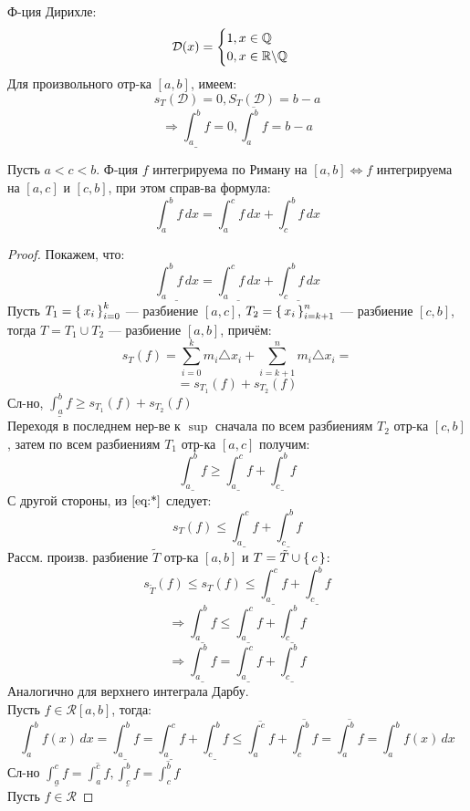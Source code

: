 \begin{example}
Ф-ция Дирихле:
\[
\mathcal{D}(x) = \begin{cases}
1, x \in \mathbb{Q} \\
0, x \in \mathbb{R} \backslash \mathbb{Q}
\end{cases}
\]
Для произвольного отр-ка $[a, b]$, имеем:
\[
s_T(\mathcal{D}) = 0, S_T(\mathcal{D}) = b - a
\]
\[
\Rightarrow \underline{\int_{a}^{b} f} = 0, \overline{\int_{a}^{b} f} = b - a
\]
\end{example}
\begin{consequence}
  \label{cs:riemann_feature_1}
  Пусть $a < c < b$. Ф-ция $f$ интегрируема по Риману на $[a, b] \iff f $ интегрируема на $[a, c]$ и $[c, b]$, при этом справ-ва формула:
  \[
    \int_{a}^{b} f \, dx = \int_{a}^{c} f \, dx + \int_{c}^{b} f \, dx
  \]
\end{consequence}
\begin{proof}
Покажем, что:
\[
  \underline{\int_{a}^{b} f \, dx} = \underline{\int_{a}^{c} f \, dx} + \underline{\int_{c}^{b} f \, dx}
\]
Пусть $T_1 = \set{x_i}_{i = 0}^{k}$ --- разбиение $[a, c]$, $T_2 = \set{x_i}_{i = k + 1}^{n}$ --- разбиение $[c, b]$, тогда $T = T_1 \cup T_2$ --- разбиение $[a, b]$, причём:
\[
s_{T}(f) = \sum_{i = 0}^{k} m_i \triangle x_i + \sum_{i = k + 1}^{n} m_i \triangle x_i = 
\]
\begin{equation}
  \label{eq:*}
  = s_{T_1}(f) + s_{T_2}(f)
\end{equation}
Сл-но, $\underline{\int_{a}^{b} f} \geq s_{T_1}(f) + s_{T_2}(f)$ \\
Переходя в последнем нер-ве к $\sup$ сначала по всем разбиениям $T_2$ отр-ка $[c, b]$, затем по всем разбиениям $T_1$ отр-ка $[a, c]$ получим:
\[
\underline{\int_{a}^{b} f} \geq \underline{\int_{a}^{c} f} + \underline{\int_{c}^{b} f}
\]
С другой стороны, из $\eqref{eq:*}$ следует:
\[
s_T(f) \leq \underline{\int_{a}^{c} f} + \underline{\int_{c}^{b} f}
\]
Рассм. произв. разбиение $\tilde{T}$ отр-ка $[a, b]$ и $T = \tilde{T} \cup \set{c}$:
\[
s_{\tilde{T}}(f) \leq s_{T}(f) \leq \underline{\int_{a}^{c} f} + \underline{\int_{c}^{b} f}
\]
\[
\Rightarrow \underline{\int_{a}^{b} f} \leq \underline{\int_{a}^{c} f} + \underline{\int_{c}^{b} f}
\]
\[
\Rightarrow  \underline{\int_{a}^{b} f} = \underline{\int_{a}^{c} f} + \underline{\int_{c}^{b} f}
\]
Аналогично для верхнего интеграла Дарбу. \\
Пусть $f \in \mathcal{R}[a, b]$, тогда:
\[
  \int_{a}^{b} f(x) \, dx = \underline{\int_{a}^{b} f} = \underline{\int_{a}^{c} f} + \underline{\int_{c}^{b} f} \leq \overline{\int_{a}^{c} f} + \overline{\int_{c}^{b} f} = \overline{\int_{a}^{b} f} = \int_{a}^{b} f(x) \, dx
\]
Сл-но $\underline{\int_{a}^{c} f} = \overline{\int_{a}^{c} f}, \underline{\int_{c}^{b} f} = \overline{\int_{c}^{b} f}$ \\
Пусть $f \in \mathcal{R}$
\end{proof}
